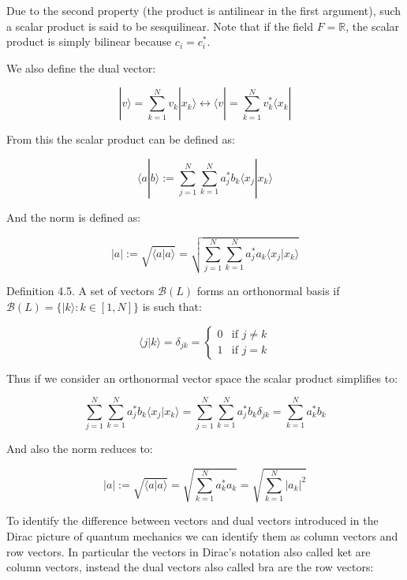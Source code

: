 \documentclass[italian]{HKNdocument}
\begin{document}
Due to the second property (the product is antilinear in the first argument), such a scalar product is said to be sesquilinear. Note that if the field $F = \mathbb{R}$, the scalar product is simply bilinear because $c_i = c_i^*$.

We also define the dual vector:

\begin{equation}
|v\rangle = \sum_{k=1}^{N} v_k|x_k\rangle \longleftrightarrow \langle v| = \sum_{k=1}^{N} v_k^*\langle x_k|
\end{equation}

From this the scalar product can be defined as:

\begin{equation}
\langle a|b\rangle := \sum_{j=1}^{N}\sum_{k=1}^{N} a_j^*b_k\langle x_j|x_k\rangle
\end{equation}

And the norm is defined as:

\begin{equation}
|a| := \sqrt{\langle a|a\rangle} = \sqrt{\sum_{j=1}^{N}\sum_{k=1}^{N} a_j^*a_k\langle x_j|x_k\rangle}
\end{equation}

Definition 4.5. A set of vectors $\mathcal{B}(L)$ forms an orthonormal basis if $\mathcal{B}(L) = \{|k\rangle: k \in [1,N]\}$ is such that:

\[
\langle j|k\rangle = \delta_{jk} = \begin{cases}
0 & \text{if } j \neq k \\
1 & \text{if } j = k
\end{cases}
\]

Thus if we consider an orthonormal vector space the scalar product simplifies to:

\begin{equation}
\sum_{j=1}^{N}\sum_{k=1}^{N} a_j^*b_k\langle x_j|x_k\rangle = \sum_{j=1}^{N}\sum_{k=1}^{N} a_j^*b_k\delta_{jk} = \sum_{k=1}^{N} a_k^*b_k
\end{equation}

And also the norm reduces to:

\begin{equation}
|a| := \sqrt{\langle a|a\rangle} = \sqrt{\sum_{k=1}^{N} a_k^*a_k} = \sqrt{\sum_{k=1}^{N}|a_k|^2}
\end{equation}

To identify the difference between vectors and dual vectors introduced in the Dirac picture of quantum mechanics we can identify them as column vectors and row vectors. In particular the vectors in Dirac's notation also called ket are column vectors, instead the dual vectors also called bra are the row vectors:
\end{document}
